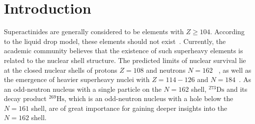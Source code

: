 \documentclass[aps,prc,reprint,superscriptaddress]{revtex4-2}
\begin{document}
\author{D. I. Solovyev}

\author{N. D. Kovrizhnykh}

\author{M. V. Shumeiko}




\date{\today}

\begin{abstract}
The $^{238}\text{U}(^{40}\text{Ar},5n)^{273}\text{Ds}$ reaction was investigated across an excitation-energy range of 40 to 51 MeV using the SHANS-2 separator. Upper cross-section limits of 833, 1118, and 511 fb were established at excitation energies of 40, 45, and 50 MeV, respectively. At an excitation energy of 49.5 MeV, two decay chains of $^{273}\text{Ds}$ were observed, yielding a production cross section of $219_{-147}^{+292}$ fb. The transitions observed in these new chains exhibit distinct energies and lifetimes, corroborating previous findings and confirming the existence of an isomeric state in $^{273}\text{Ds}$ in addition to the ground state. The measured cross section is in excellent agreement with the previously reported value of $180_{-120}^{+440}$ fb obtained at the DGFRS-2 separator at 49 MeV.
\end{abstract}

\maketitle

\section{Introduction}

Superactinides are generally considered to be elements with $Z \ge 104$. According to the liquid drop model, these elements should not exist~\cite{Hahn1939}. Currently, the academic community believes that the existence of such superheavy elements is related to the nuclear shell structure. The predicted limits of nuclear survival lie at the closed nuclear shells of protons $Z=108$ and neutrons $N=162$ ~\cite{Smolanczuk1995}, as well as the emergence of heavier superheavy nuclei with $Z=114-126$ and $N=184$~\cite{Oganessian2015}. As an odd-neutron nucleus with a single particle on the $N=162$ shell, $^{273}\text{Ds}$ and its decay product $^{269}\text{Hs}$, which is an odd-neutron nucleus with a hole below the $N=161$ shell, are of great importance for gaining deeper insights into the $N=162$ shell.
\end{document}
